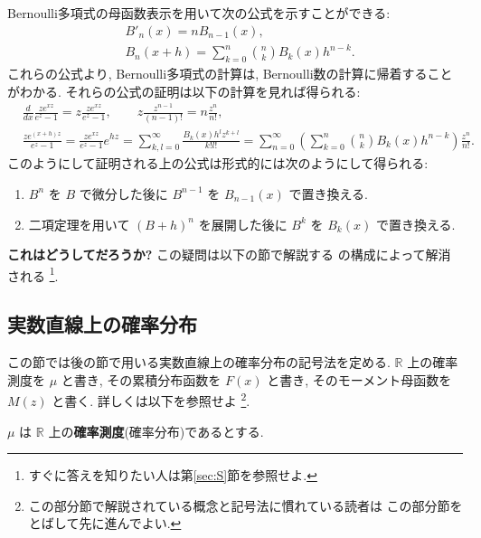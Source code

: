 \documentclass[12pt,twoside]{jarticle}
\newcommand\BF{\bfseries}
\newcommand\R{{\mathbb R}} %
\theoremstyle{jplain}
\theoremstyle{jplain}
\theoremstyle{jplain}
\numberwithin{theorem}{section}
\numberwithin{equation}{section}
\numberwithin{figure}{section}
\numberwithin{table}{section}
\newcommand\secref[1]{第\ref{#1}節}
\begin{document}
Bernoulli多項式の母函数表示を用いて次の公式を示すことができる:
\begin{align*}
& B'_n(x) = n B_{n-1}(x), \\
& B_n(x+h) = \sum_{k=0}^n \binom{n}{k} B_k(x)h^{n-k}.
\end{align*}
これらの公式より, Bernoulli多項式の計算は,
Bernoulli数の計算に帰着することがわかる.
それらの公式の証明は以下の計算を見れば得られる:
\begin{align*}
  &
  \frac{d}{dx}\frac{ze^{xz}}{e^z-1}=z\frac{ze^{xz}}{e^z-1},
  \qquad
  z\frac{z^{n-1}}{(n-1)!} = n\frac{z^n}{n!},
  \\ &
  \frac{ze^{(x+h)z}}{e^z-1}=\frac{ze^{xz}}{e^z-1}e^{hz}
  =\sum_{k,l=0}^\infty \frac{B_k(x)h^l z^{k+l}}{k!l!}
  =\sum_{n=0}^\infty
  \left(\sum_{k=0}^n\binom{n}{k}B_k(x)h^{n-k}\right)
  \frac{z^n}{n!}.
\end{align*}
このようにして証明される上の公式は形式的には次のようにして得られる:
\begin{enumerate}
  \item $B^n$ を $B$ で微分した後に $B^{n-1}$ を $B_{n-1}(x)$ で置き換える.
  \item 二項定理を用いて $(B+h)^n$ を展開した後に
    $B^k$ を $B_k(x)$ で置き換える.
\end{enumerate}
{\BF これはどうしてだろうか?}
この疑問は以下の節で解説する \cite{BCM2009} の構成によって解消される%
\footnote{すぐに答えを知りたい人は\secref{sec:S}を参照せよ.}.


\subsection{実数直線上の確率分布}
\label{sec:mu}

この節では後の節で用いる実数直線上の確率分布の記号法を定める.
$\R$ 上の確率測度を $\mu$ と書き, その累積分布函数を $F(x)$ と書き,
そのモーメント母函数を $M(z)$ と書く.
詳しくは以下を参照せよ%
\footnote{この部分節で解説されている概念と記号法に慣れている読者は
この部分節をとばして先に進んでよい.}.

$\mu$ は $\R$ 上の{\BF 確率測度}(確率分布)であるとする.
\end{document}
